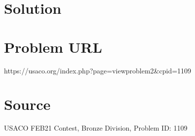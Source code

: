 \documentclass[12pt]{article}
\begin{document}
\section*{Solution}


\section*{Problem URL}
https://usaco.org/index.php?page=viewproblem2&cpid=1109

\section*{Source}
USACO FEB21 Contest, Bronze Division, Problem ID: 1109
\end{document}
